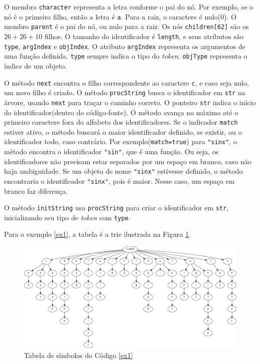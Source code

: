 O membro \texttt{character} representa a letra conforme o pai do nó.
Por exemplo, se o nó é o primeiro filho, então a letra é \texttt{a}.
Para a raiz, o caractere é nulo(0).
O membro \texttt{parent} é o pai do nó, ou nulo para a raiz.
Os nós \texttt{children[62]} são os $26+26+10$ filhos.
O tamanho do identificador é \texttt{length}, e seus atributos são
\texttt{type}, \texttt{argIndex} e \texttt{objIndex}.
O atributo \texttt{argIndex} representa os argumentos de uma função definida.
\texttt{type} sempre indica o tipo do \textit{token}.
\texttt{objType} representa o índice de um objeto.

O método \texttt{next} encontra o filho correspondente ao caractere \texttt{c},
e caso seja nulo, um novo filho é criado.
O método \texttt{procString} busca o identificador em \texttt{str} na árvore,
usando \texttt{next} para traçar o caminho correto.
O ponteiro \texttt{str} indica o início do identificador(dentro do código-fonte).
O método avança no máximo até o primeiro caractere fora do alfabeto
dos identificadores.
Se o indicador \texttt{match} estiver ativo, o método buscará o
maior identificador definido, se existir, ou o identificador todo, caso contrário.
Por exemplo(\texttt{match=true}) para \texttt{"sinx"},
o método encontra o identificador \texttt{"sin"}, que é uma função.
Ou seja, os identificadores não precisam estar separados por um espaço em branco,
caso não haja ambiguidade.
Se um objeto de nome \texttt{"sinx"} estivesse definido,
o método encontraria o identificador \texttt{"sinx"}, pois é maior.
Nesse caso, um espaço em branco faz diferença.

O método \texttt{initString} usa \texttt{procString}
para criar o identificador em \texttt{str},
inicializando seu tipo de \textit{token} com \texttt{type}.

Para o exemplo \ref{ex1}, a tabela é a trie ilustrada na Figura \ref{img:ex1table}.
\begin{figure}[!ht]
    \includegraphics[width=\linewidth, frame]{ex1table.png}
    \caption{Tabela de símbolos do Código \ref{ex1}}
    \label{img:ex1table}
\end{figure}

